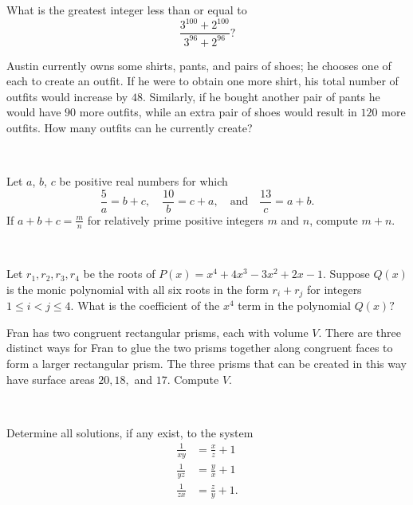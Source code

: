 \documentclass{article}
\begin{document}

\begin{prob}[AMC 10A 2018/14]{2}
What is the greatest integer less than or equal to\[\frac{3^{100}+2^{100}}{3^{96}+2^{96}}?\]
\end{prob}

\begin{prob}[2008-2009 Mandelbrot]{3}
Austin currently owns some shirts, pants, and pairs of shoes; he chooses one of each to create an outfit. If he were to obtain one more shirt, his total number of outfits would increase by $48.$ Similarly, if he bought another pair of pants he would have $90$ more outfits, while an extra pair of shoes would result in $120$ more outfits. How many outfits can he currently create?
\end{prob}
  \\

\begin{prob}{4}
Let $a$, $b$, $c$ be positive real numbers for which \[
  \frac{5}{a} = b+c, \quad
  \frac{10}{b} = c+a, \quad \text{and} \quad
  \frac{13}{c} = a+b. \] If $a+b+c = \frac mn$ for relatively prime positive integers $m$ and $n$, compute $m+n$.
\end{prob}
  \\
  
\begin{prob}[JMC 10 2021/22]{5}
Let $r_1,r_2,r_3,r_4$ be the roots of $P(x)= x^4+4x^3-3x^2+2x-1.$ Suppose $Q(x)$ is the monic polynomial with all six roots in the form $r_{i}+r_{j}$ for integers $1\le i < j \le 4.$ What is the coefficient of the $x^4$ term in the polynomial $Q(x)?$
\end{prob}


\begin{prob}{5}
Fran has two congruent rectangular prisms, each with volume $V$. There are three distinct ways for Fran to glue the two prisms together along congruent faces to form a larger rectangular prism. The three prisms that can be created in this way have surface areas $20,18,$ and $17$. Compute $V$.
\end{prob}
\\

\begin{prob}[vvluo]{6}
Determine all solutions, if any exist, to the system
\begin{align*}
\frac{1}{xy}&=\frac{x}{z}+1 \\
\frac{1}{yz}&=\frac{y}{x}+1 \\
\frac{1}{zx}&=\frac{z}{y}+1.
\end{align*}
\end{prob}
\\
\end{document}
